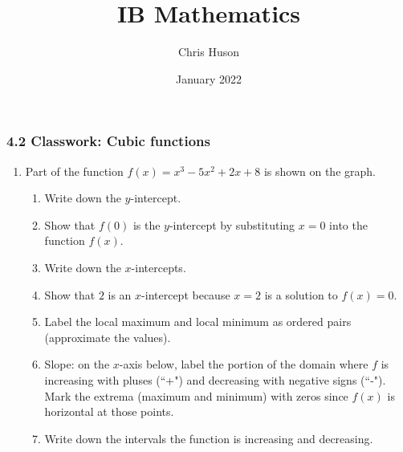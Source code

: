 \documentclass[12pt, twoside]{article}
\title{IB Mathematics}
\author{Chris Huson}
\date{January 2022}
\begin{document}
\subsubsection*{4.2 Classwork: Cubic functions}
\begin{enumerate}
    \item Part of the function $f(x)=x^3-5x^2+2x+8$ is shown on the graph.\\

\begin{enumerate}
  \item Write down the $y$-intercept.
  \item Show that $f(0)$ is the $y$-intercept by substituting $x=0$ into the function $f(x)$.\vspace{1cm}
  \item Write down the $x$-intercepts.
  \item Show that $2$ is an $x$-intercept because $x=2$ is a solution to $f(x)=0$.\vspace{1cm}
  \item Label the local maximum and local minimum as ordered pairs (approximate the values).
  \item Slope: on the $x$-axis below, label the portion of the domain where $f$ is increasing with pluses (``+") and decreasing with negative signs (``-"). Mark the extrema (maximum and minimum) with zeros since $f(x)$ is horizontal at those points.
  \item Write down the intervals the function is increasing and decreasing.
\end{enumerate}\vspace{1cm}


\end{enumerate}
\end{document}
